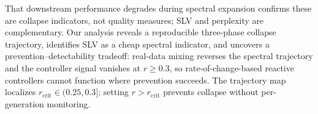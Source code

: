 
That downstream performance degrades during spectral expansion confirms these are collapse indicators, not quality measures; SLV and perplexity are complementary.
Our analysis reveals a reproducible three-phase collapse trajectory, identifies SLV as a cheap spectral indicator, and uncovers a prevention--detectability tradeoff: real-data mixing reverses the spectral trajectory and the controller signal vanishes at $r \geq 0.3$, so rate-of-change-based reactive controllers cannot function where prevention succeeds.
The trajectory map localizes $r_{\text{crit}} \in (0.25, 0.3]$; setting $r > r_{\text{crit}}$ prevents collapse without per-generation monitoring.
